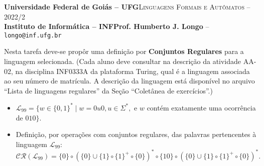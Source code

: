 \documentclass[12pt]{article}
\def\discente{Fulana(o) de tal}
\def\matricula{20010101}
\def\ua{02}
\def\myling{{99}} %
\newcommand{\concatL}{\ensuremath{{\scriptstyle\circ}}}%
\begin{document}
 \begin{tcolorbox}[rounded corners, colback=blue!3, colframe=blue!40!black]
  \footnotesize\textbf{Universidade Federal de Goiás -- UFG}\hfill \textsc{Linguagens Formais e Autômatos -- 2022/2}\\
  \footnotesize\textbf{Instituto de Informática -- INF\hfill Prof. Humberto J. Longo} -- \scriptsize\texttt{longo@inf.ufg.br}
 \end{tcolorbox}\bigskip
%
\begin{tcolorbox}[rounded corners, colback=blue!2, colframe=blue!40!black, title=\textbf{Atividade AA-\ua}]
   Nesta tarefa deve-se propôr uma definição por \textbf{Conjuntos Regulares} para a linguagem selecionada. (Cada aluno deve consultar na descrição da atividade AA-\ua, na disciplina INF0333A da plataforma Turing, qual é a linguagem associada ao seu número de matrícula. A descrição da linguagem está disponível no arquivo ``Lista de linguagens regulares'' da Seção ``Coletânea de exercícios''.)
\end{tcolorbox}\bigskip
%
%
\begin{tcolorbox}[rounded corners, colback=yellow!5, colframe=red!40!black, title=\textbf{\matricula\ -- \discente}]
 \begin{itemize}[leftmargin=*]
  \item $\mathcal{L}_\myling = \{w\in\{0,1\}^*\mid w=0u0, u\in\Sigma^*,$ e $w$ contém exatamente uma ocorrência de $010\}$.
%
  \item Definição, por operações com conjuntos regulares, das palavras pertencentes à linguagem $\mathcal{L}_\myling$:
   $$\mathcal{CR}(\mathcal{L}_\myling) =
    \{0\}\concatL(\{0\}\cup \{1\}\concatL\{1\}^+\concatL\{0\})^*\concatL\{10\}\concatL(\{0\}\cup \{1\}\concatL\{1\}^+\concatL\{0\})^*
   .$$
 \end{itemize}
\end{tcolorbox}
%
%
\end{document}

